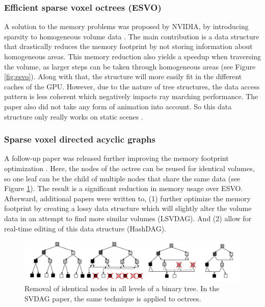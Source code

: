 \subsubsection{Efficient sparse voxel octrees (ESVO)} \label{related_work:voxel_data_structures:esvo}
A solution to the memory problems was proposed by NVIDIA, by introducing sparsity to homogeneous volume data \cite{laine2010efficient}. The main contribution is a data structure that drastically reduces the memory footprint by not storing information about homogeneous areas. This memory reduction also yields a speedup when traversing the volume, as larger steps can be taken through homogeneous areas (see Figure \ref{fig:esvo}). Along with that, the structure will more easily fit in the different caches of the GPU. However, due to the nature of tree structures, the data access pattern is less coherent which negatively impacts ray marching performance. The paper also did not take any form of animation into account. So this data structure only really works on static scenes \cite{JohnLinPerfectEngine}.


\subsubsection{Sparse voxel directed acyclic graphs} \label{related_work:voxel_data_structures:svdag}
A follow-up paper was released further improving the memory footprint optimization \cite{kampe2013high}. Here, the nodes of the octree can be reused for identical volumes, so one leaf can be the child of multiple nodes that share the same data (see Figure \ref{fig:DAG_node_deduplication}). The result is a significant reduction in memory usage over ESVO. Afterward, additional papers were written to, (1) further optimize the memory footprint by creating a lossy data structure which will slightly alter the volume data in an attempt to find more similar volumes \cite{van2020lossy} (LSVDAG). And (2) allow for real-time editing of this data structure \cite{careil2020interactively} (HashDAG).

\begin{figure}
    \centering
    \includegraphics[width=\linewidth]{figures/DAG_node_deduplication.png}
    \caption{Removal of identical nodes in all levels of a binary tree. In the SVDAG paper, the same technique is applied to octrees. \cite{kampe2013high}}
    \label{fig:DAG_node_deduplication}
\end{figure}
